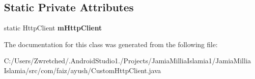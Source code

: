 \subsection*{Static Private Attributes}
\begin{DoxyCompactItemize}
\item 
\hypertarget{classcom_1_1faiz_1_1ayush_1_1_custom_http_client_a129e966f243501f537b2e7ff3b632694}{}static Http\+Client {\bfseries m\+Http\+Client}\label{classcom_1_1faiz_1_1ayush_1_1_custom_http_client_a129e966f243501f537b2e7ff3b632694}

\end{DoxyCompactItemize}


The documentation for this class was generated from the following file\+:\begin{DoxyCompactItemize}
\item 
C\+:/\+Users/\+Zwretched/.\+Android\+Studio1./\+Projects/\+Jamia\+Millia\+Islamia1/\+Jamia\+Millia\+Islamia/src/com/faiz/ayush/Custom\+Http\+Client.\+java\end{DoxyCompactItemize}
